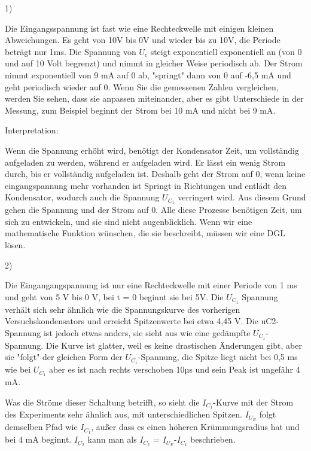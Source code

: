 %
%
1)

Die Eingangsspannung ist fast wie eine Rechteckwelle mit einigen kleinen Abweichungen. Es geht von 10V bis 0V und wieder bis zu 10V, die Periode beträgt nur 1ms. Die Spannung von $U_c$ steigt exponentiell exponentiell an (von 0 und auf 10 Volt begrenzt) und nimmt in gleicher Weise periodisch ab. Der Strom nimmt exponentiell von 9 $\si{\milli\ampere}$ auf 0 ab, "springt" dann von 0 auf -6,5 
$\si{\milli\ampere} $ und geht periodisch wieder auf 0. Wenn Sie die gemessenen Zahlen vergleichen, werden Sie sehen, dass sie anpassen miteinander, aber es gibt Unterschiede in der Messung, zum Beispiel beginnt der Strom bei 10 $\si{\milli\ampere}$ und nicht bei 9 $\si{\milli\ampere}$.

Interpretation:

Wenn die Spannung erhöht wird, benötigt der Kondensator Zeit, um vollständig aufgeladen zu werden, während er aufgeladen wird. Er lässt ein wenig Strom durch, bis er vollständig aufgeladen ist. Deshalb geht der Strom auf 0, wenn keine eingangspannung mehr vorhanden ist Springt in Richtungen und entlädt den Kondensator, wodurch auch die Spannung $U_{C_1}$ verringert wird. Aus diesem Grund gehen die Spannung und der Strom auf 0. Alle diese Prozesse benötigen Zeit, um sich zu entwickeln, und sie sind nicht augenblicklich. Wenn wir eine mathematische Funktion wünschen, die sie beschreibt, müssen wir eine DGL lösen.



2)

Die Eingangangspannung ist nur eine Rechteckwelle mit einer Periode von 1 ms und geht von 5 V bis 0 V, bei t = 0 beginnt sie bei 5V. Die $U_{C_1}$ Spannung verhält sich sehr ähnlich wie die Spannungskurve des vorherigen Versuchskondensators und erreicht Spitzenwerte bei etwa 4,45 V. Die uC2-Spannung ist jedoch etwas anders, sie sieht aus wie eine gedämpfte $U_{C_1}$-Spannung. Die Kurve ist glatter, weil es keine drastischen Änderungen gibt, aber sie "folgt" der gleichen Form der $U_{C_1}$-Spannung, die Spitze liegt nicht bei 0,5 ms wie bei $U_{C_1}$ aber es ist nach rechts verschoben 10µs und sein Peak ist ungefähr 4$\si{\milli\ampere}$.



Was die Ströme dieser Schaltung betrifft, so sieht die $I_{C_1}$-Kurve mit der Strom des Experiments sehr ähnlich aus, mit unterschiedlichen Spitzen. $I_{U_E}$ folgt demselben Pfad wie $I_{C_1}$, außer dass es einen höheren Krümmungsradius hat und bei 4 $\si{\milli\ampere}$ beginnt. $I_{C_2}$ kann man als $I_{C_2}$ = $I_{U_E}$-$I_{C_1}$ beschrieben.

